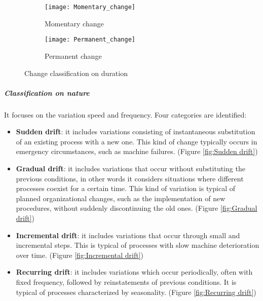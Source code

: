 \begin{figure}[H]
  \centering
  \begin{subfigure}[b]{0.4\textwidth}
    \texttt{[image: Momentary\_change]}
    \caption{Momentary change}
    \label{fig:Momentary change}   
  \end{subfigure}
  \hspace{0.1\textwidth}
  \begin{subfigure}[b]{0.4\textwidth}
    \texttt{[image: Permanent\_change]}
    \caption{Permanent change}
    \label{fig:Permanent change}
  \end{subfigure}             
  \caption{Change classification on duration}
  \label{fig:Change classification on duration}
\end{figure}
\subparagraph{Classification on nature} It focuses on the variation speed and frequency. Four categories are identified:
\begin{itemize}
\item \textbf{Sudden drift}: it includes variations consisting of instantaneous substitution of an existing process with a new one. This kind of change typically occurs in emergency circumstances, such as machine failures. (Figure \ref{fig:Sudden drift})
\item \textbf{Gradual drift}: it includes variations that occur without substituting the previous conditions, in other words it considers situations where different processes coexist for a certain time. This kind of variation is typical of planned organizational changes, such as the implementation of new procedures, without suddenly discontinuing the old ones. (Figure \ref{fig:Gradual drift})
\item \textbf{Incremental drift}: it includes variations that occur through small and incremental steps. This is typical of processes with slow machine deterioration over time. (Figure \ref{fig:Incremental drift})
\item \textbf{Recurring drift}: it includes variations which occur periodically, often with fixed frequency, followed by reinstatements of previous conditions. It is typical of processes characterized by seasonality. (Figure \ref{fig:Recurring drift})
\end{itemize}
